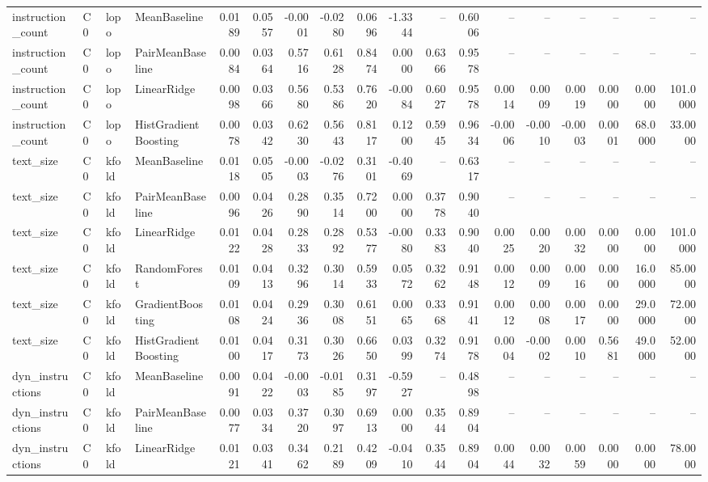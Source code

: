 \begin{table}[t]
\begin{tabular}{llllrrrrrrrrrrrrrr}
instruction\_count & C0 & lopo & MeanBaseline & 0.0189 & 0.0557 & -0.0001 & -0.0280 & 0.0696 & -1.3344 & -- & 0.6006 & -- & -- & -- & -- & -- & -- \\
instruction\_count & C0 & lopo & PairMeanBaseline & 0.0084 & 0.0364 & 0.5716 & 0.6128 & 0.8474 & 0.0000 & 0.6366 & 0.9578 & -- & -- & -- & -- & -- & -- \\
instruction\_count & C0 & lopo & LinearRidge & 0.0098 & 0.0366 & 0.5680 & 0.5386 & 0.7620 & -0.0084 & 0.6027 & 0.9578 & 0.0014 & 0.0009 & 0.0019 & 0.0000 & 0.0000 & 101.0000 \\
instruction\_count & C0 & lopo & HistGradientBoosting & 0.0078 & 0.0342 & 0.6230 & 0.5643 & 0.8117 & 0.1200 & 0.5945 & 0.9634 & -0.0006 & -0.0010 & -0.0003 & 0.0001 & 68.0000 & 33.0000 \\
text\_size & C0 & kfold & MeanBaseline & 0.0118 & 0.0505 & -0.0003 & -0.0276 & 0.3101 & -0.4069 & -- & 0.6317 & -- & -- & -- & -- & -- & -- \\
text\_size & C0 & kfold & PairMeanBaseline & 0.0096 & 0.0426 & 0.2890 & 0.3514 & 0.7200 & 0.0000 & 0.3778 & 0.9040 & -- & -- & -- & -- & -- & -- \\
text\_size & C0 & kfold & LinearRidge & 0.0122 & 0.0428 & 0.2833 & 0.2892 & 0.5377 & -0.0080 & 0.3383 & 0.9040 & 0.0025 & 0.0020 & 0.0032 & 0.0000 & 0.0000 & 101.0000 \\
text\_size & C0 & kfold & RandomForest & 0.0109 & 0.0413 & 0.3296 & 0.3014 & 0.5933 & 0.0572 & 0.3262 & 0.9148 & 0.0012 & 0.0009 & 0.0016 & 0.0000 & 16.0000 & 85.0000 \\
text\_size & C0 & kfold & GradientBoosting & 0.0108 & 0.0424 & 0.2936 & 0.3008 & 0.6151 & 0.0065 & 0.3368 & 0.9141 & 0.0012 & 0.0008 & 0.0017 & 0.0000 & 29.0000 & 72.0000 \\
text\_size & C0 & kfold & HistGradientBoosting & 0.0100 & 0.0417 & 0.3173 & 0.3026 & 0.6650 & 0.0399 & 0.3274 & 0.9178 & 0.0004 & -0.0002 & 0.0010 & 0.5681 & 49.0000 & 52.0000 \\
dyn\_instructions & C0 & kfold & MeanBaseline & 0.0091 & 0.0422 & -0.0003 & -0.0185 & 0.3197 & -0.5927 & -- & 0.4898 & -- & -- & -- & -- & -- & -- \\
dyn\_instructions & C0 & kfold & PairMeanBaseline & 0.0077 & 0.0334 & 0.3720 & 0.3097 & 0.6913 & 0.0000 & 0.3544 & 0.8904 & -- & -- & -- & -- & -- & -- \\
dyn\_instructions & C0 & kfold & LinearRidge & 0.0121 & 0.0341 & 0.3462 & 0.2189 & 0.4209 & -0.0410 & 0.3544 & 0.8904 & 0.0044 & 0.0032 & 0.0059 & 0.0000 & 0.0000 & 78.0000 \\

\end{tabular}
\end{table}
